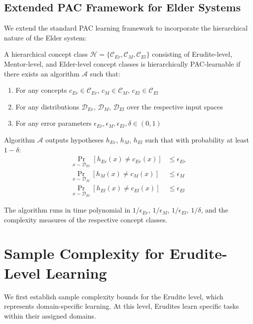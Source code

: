\subsection{Extended PAC Framework for Elder Systems}

We extend the standard PAC learning framework to incorporate the hierarchical nature of the Elder system:



\begin{definition}
A hierarchical concept class $\mathcal{H} = \{\mathcal{C}_{Er}, \mathcal{C}_{M}, \mathcal{C}_{El}\}$ consisting of Erudite-level, Mentor-level, and Elder-level concept classes is hierarchically PAC-learnable if there exists an algorithm $\mathcal{A}$ such that:
\begin{enumerate}
    \item For any concepts $c_{Er} \in \mathcal{C}_{Er}$, $c_{M} \in \mathcal{C}_{M}$, $c_{El} \in \mathcal{C}_{El}$
    \item For any distributions $\mathcal{D}_{Er}$, $\mathcal{D}_{M}$, $\mathcal{D}_{El}$ over the respective input spaces
    \item For any error parameters $\epsilon_{Er}, \epsilon_{M}, \epsilon_{El}, \delta \in (0, 1)$
\end{enumerate}

Algorithm $\mathcal{A}$ outputs hypotheses $h_{Er}$, $h_{M}$, $h_{El}$ such that with probability at least $1 - \delta$:
\begin{align}
\Pr_{x \sim \mathcal{D}_{Er}}[h_{Er}(x) \neq c_{Er}(x)] &\leq \epsilon_{Er} \\
\Pr_{x \sim \mathcal{D}_{M}}[h_{M}(x) \neq c_{M}(x)] &\leq \epsilon_{M} \\
\Pr_{x \sim \mathcal{D}_{El}}[h_{El}(x) \neq c_{El}(x)] &\leq \epsilon_{El}
\end{align}

The algorithm runs in time polynomial in $1/\epsilon_{Er}$, $1/\epsilon_{M}$, $1/\epsilon_{El}$, $1/\delta$, and the complexity measures of the respective concept classes.
\end{definition}

\section{Sample Complexity for Erudite-Level Learning}

We first establish sample complexity bounds for the Erudite level, which represents domain-specific learning. At this level, Erudites learn specific tasks within their assigned domains.

